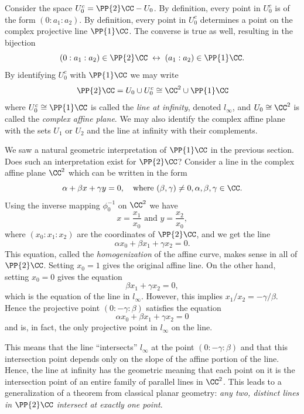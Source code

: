 Consider the space $U_0^c = \PP{2}\CC - U_0$. By definition, every point
in $U_0^c$ is of the form $(0 : a_1 : a_2)$. By definition, every point
in $U_0^c$ determines a point on the complex projective line
$\PP{1}\CC$. The converse is true as well, resulting in the bijection
\[
    (0 : a_1 : a_2) \in \PP{2}\CC
    \; \leftrightarrow \;
    (a_1 : a_2) \in \PP{1}\CC.
\]
By identifying $U_0^c$ with $\PP{1}\CC$ we may write
\begin{equation} \label{eqn: proejctive-plane}
  \PP{2}\CC = U_0 \cup U_0^c \cong \CC^2 \cup \PP{1}\CC
\end{equation}
where $U_0^c \cong \PP{1}\CC$ is called the {\it line at infinity},
denoted $l_\infty$, and $U_0 \cong \CC^2$ is called the {\it complex
  affine plane}. We may also identify the complex affine plane with the
sets $U_1$ or $U_2$ and the line at infinity with their complements.

We saw a natural geometric interpretation of $\PP{1}\CC$ in the previous
section. Does such an interpretation exist for $\PP{2}\CC$? Consider a line
in the complex affine plane $\CC^2$ which can be written in the form
\[
    \alpha + \beta x + \gamma y = 0,
    \quad \text{where }
    (\beta,\gamma) \neq 0, \alpha, \beta, \gamma \in \CC.
\]
Using the inverse mapping $\phi_0^{-1}$ on $\CC^2$ we have
\[
    x = \frac{x_1}{x_0} \text{ and } y = \frac{x_2}{x_0},
\]
where $(x_0 : x_1 : x_2)$ are the coordinates of $\PP{2}\CC$, and we get
the line
\[
    \alpha x_0 + \beta x_1 + \gamma x_2 = 0.
\]
This equation, called the {\it homogenization} of the affine curve,
makes sense in all of $\PP{2}\CC$. Setting $x_0 = 1$ gives the original
affine line. On the other hand, setting $x_0 = 0$ gives the equation
\[
    \beta x_1 + \gamma x_2 = 0,
\]
which is the equation of the line in $l_\infty$. However, this implies
$x_1 / x_2 = - \gamma / \beta$. Hence the projective point $(0 : -\gamma
: \beta)$ satisfies the equation
\[
    \alpha x_0 + \beta x_1 + \gamma x_2 = 0
\]
and is, in fact, the only projective point in $l_\infty$ on the line.

This means that the line ``intersects'' $l_\infty$ at the point $(0 :
-\gamma : \beta)$ and that this intersection point depends only on the
slope of the affine portion of the line. Hence, the line at infinity has
the geometric meaning that each point on it is the intersection point of
an entire family of parallel lines in $\CC^2$. This leads to a
generalization of a theorem from classical planar geometry: {\it any
  two, distinct lines in $\PP{2}\CC$ intersect at exactly one point}.

